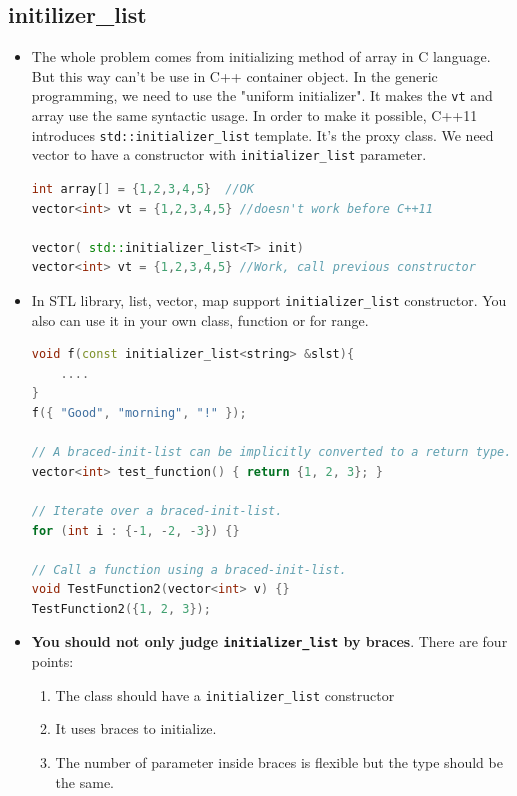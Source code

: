 \documentclass[a4paper,11pt,twoside]{book}
\begin{document}
\subsection{initilizer\_list}
\begin{itemize}
	\item The whole problem comes from initializing method of array in C language. But this way can't be use in C++ container object. In the generic programming, we need to use the "uniform initializer". It  makes the \texttt{vt} and array use the same syntactic usage. In order to make it possible, C++11 introduces \texttt{std::initializer\_list} template. It's the proxy class. We need vector to have a constructor with \texttt{initializer\_list} parameter.
\begin{lstlisting}[frame=single, language=c++,mathescape=true]
int array[] = {1,2,3,4,5}  //OK 
vector<int> vt = {1,2,3,4,5} //doesn't work before C++11 

vector( std::initializer_list<T> init)
vector<int> vt = {1,2,3,4,5} //Work, call previous constructor
\end{lstlisting}
		
	\item In STL library, list, vector, map support \texttt{initializer\_list} constructor. You also can use it in your own class, function or for range.
\begin{lstlisting}[frame=single, language=c++,mathescape=true]
void f(const initializer_list<string> &slst){
	....
}
f({ "Good", "morning", "!" });
	
// A braced-init-list can be implicitly converted to a return type.
vector<int> test_function() { return {1, 2, 3}; }
	
// Iterate over a braced-init-list.
for (int i : {-1, -2, -3}) {}
	
// Call a function using a braced-init-list.
void TestFunction2(vector<int> v) {}
TestFunction2({1, 2, 3}); 
\end{lstlisting}

	\item  \textbf{You should not only judge \texttt{initializer\_list} by braces}. There are four points:
	\begin{enumerate}
		\item The class should have a \texttt{initializer\_list} constructor 
		\item It uses braces to initialize.
		\item The number of parameter inside braces is flexible but the type should be the same.
	\end{enumerate}


\end{itemize}
\end{document}
